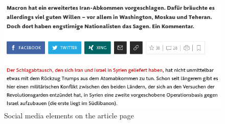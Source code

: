 \begin{figure}[h]
	\begin{center}
		\includegraphics[width=0.8\linewidth]{sections/figures/fb-button}
	\end{center}
\caption{Social media elements on the article page}\label{fig:fb-button}
\end{figure}
